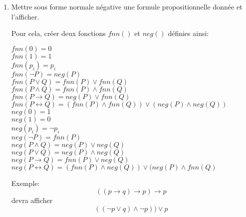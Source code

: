 \documentclass[11pt]{article}
\newcommand{\Num}{4}
\newcounter{numexercice}
\newenvironment{exercice}{\addtocounter{numexercice}{1}
\noindent{\large \bf Exercice {\Num}.\thenumexercice }}{\bigskip}
\begin{document}
\begin{exercice}
\begin{enumerate}
\item Mettre sous forme normale négative une formule propositionnelle
  donnée et l'afficher.

Pour cela, créer deux fonctions $fnn()$ et $neg()$ définies ainsi:

\begin{tabbing}
$fnn(0) = 0$\\
$fnn(1) = 1$\\
$fnn(p_i) = p_i$\\
$fnn(\lnot P) = neg(P)$\\
$fnn(P \lor Q) = fnn(P) \lor fnn(Q)$\\
$fnn(P \land Q) = fnn(P) \land fnn(Q)$\\
$fnn(P \rightarrow Q) = neg(P) \lor fnn(Q)$\\
$fnn(P \leftrightarrow Q) = (fnn(P) \land fnn(Q)) \lor (neg(P) \land neg(Q))$\\
$neg(0) = 1$\\
$neg(1) = 0$\\
$neg(p_i) = \lnot p_i$\\
$neg(\lnot P) = fnn(P)$\\
$neg(P \land Q) = neg(P) \lor neg(Q)$\\
$neg(P \lor Q) = neg(P) \land neg(Q)$\\
$neg(P \rightarrow Q) = fnn(P) \lor neg(Q)$\\
$neg(P \leftrightarrow Q) = (fnn(P) \land neg(Q)) \lor (neg(P) \land fnn(Q)$\\
\end{tabbing}

Exemple: $$((p \rightarrow q) \rightarrow p) \rightarrow p$$ devra
afficher $$((\lnot p \lor q) \land \lnot p)) \lor p$$
\end{enumerate}
\end{exercice}
\end{document}
